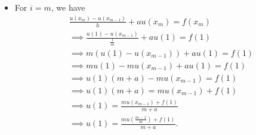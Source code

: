 \documentclass[letterpaper]{article}
\begin{document}
\begin{enumerate}
\begin{itemize}
        \item For $i = m$, we have 
        \begin{equation*}
            \begin{aligned}
                &\frac{u(x_m) - u(x_{m - 1})}{h} + au(x_m) = f(x_m) \\ 
                    &\implies \frac{u(1) - u(x_{m - 1})}{\frac{1}{m}} + au(1) = f(1) \\ 
                    &\implies m(u(1) - u(x_{m - 1})) + au(1) = f(1) \\ 
                    &\implies mu(1) - mu(x_{m - 1}) + au(1) = f(1) \\ 
                    &\implies u(1)(m + a) - mu(x_{m - 1}) = f(1) \\ 
                    &\implies u(1)(m + a) = mu(x_{m - 1}) + f(1) \\ 
                    &\implies u(1) = \frac{mu(x_{m - 1}) + f(1)}{m + a} \\ 
                    &\implies u(1) = \frac{mu(\frac{m - 1}{m}) + f(1)}{m + a}.
            \end{aligned}
        \end{equation*}
    \end{itemize}
\end{enumerate}
\end{document}
